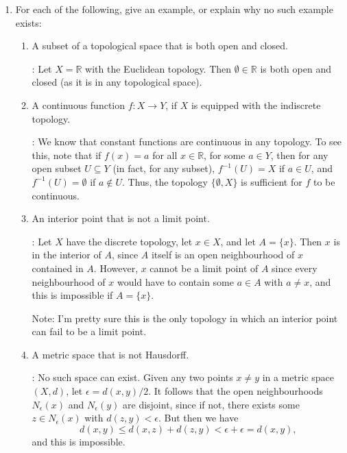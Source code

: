 \documentclass[12pt]{article}
\newcommand{\points}[1]{\marginpar{\hspace{24pt}[#1]}}
\newcommand{\R}{\mathbb{R}}
\begin{document}
\begin{enumerate}
\item For each of the following, give an example, or explain why no such example exists:
\begin{enumerate}
\item A subset of a topological space that is both open and closed. \points{3}

\bigskip

: Let $X=\R$ with the Euclidean topology. Then $\emptyset\in\R$ is both open and closed (as it is in any topological space).

\bigskip

\item A continuous function $f:X\to Y$, if $X$ is equipped with the indiscrete topology. \points{3}


\bigskip

: We know that constant functions are continuous in any topology. To see this, note that if $f(x)=a$ for all $x\in\R$, for some $a\in Y$, then for any open subset $U\subseteq Y$ (in fact, for any subset), $f^{-1}(U)=X$ if $a\in U$, and $f^{-1}(U)=\emptyset$ if $a\notin U$. Thus, the topology $\{\emptyset, X\}$ is sufficient for $f$ to be continuous.

\bigskip


\item An interior point that is not a limit point. \points{3}


\bigskip

: Let $X$ have the discrete topology, let $x\in X$, and let $A=\{x\}$. Then $x$ is in the interior of $A$, since $A$ itself is an open neighbourhood of $x$ contained in $A$. However, $x$ cannot be a limit point of $A$ since every neighbourhood of $x$ would have to contain some $a\in A$ with $a\neq x$, and this is impossible if $A=\{x\}$.

Note: I'm pretty sure this is the only topology in which an interior point can fail to be a limit point. 

\bigskip


\item A metric space that is not Hausdorff. \points{3}

\bigskip

: No such space can exist. Given any two points $x\neq y$ in a metric space $(X,d)$, let $\epsilon = d(x,y)/2$. It follows that the open neighbourhoods $N_\epsilon(x)$ and $N_\epsilon(y)$ are disjoint, since if not, there exists some $z\in N_\epsilon(x)$ with $d(z,y)<\epsilon$. But then we have
\[
 d(x,y)\leq d(x,z)+d(z,y) <\epsilon+\epsilon = d(x,y),
\]
and this is impossible.


\end{enumerate}
\end{enumerate}
\end{document}
